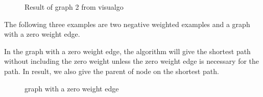 \documentclass[11pt]{article}  %
\begin{document}
\begin{figure}[htbp]
{}
\quad
{}
\caption{ Result of graph 2 from visualgo}
\end{figure}\par

\clearpage

The following three examples are two negative weighted examples and a graph with a zero weight edge.\par

In the graph with a zero weight edge, the algorithm will give the shortest path without including the zero weight unless the zero weight edge is necessary for the path. In result, we also give the parent of node on the shortest path.\par

\begin{figure}[htbp]
\centering
{}
\quad
{}
\caption{ graph with a zero weight edge}
\end{figure}\par
\end{document}
